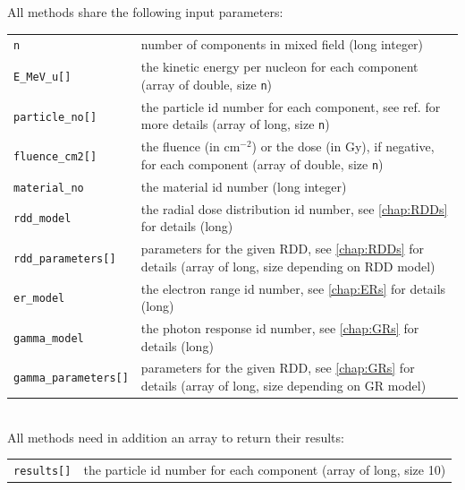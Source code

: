 All methods share the following input parameters:\\
\begin{tabular}{p{} p{}}
\texttt{n} & number of components in mixed field (long integer) \\
\texttt{E\_MeV\_u[]} & the kinetic energy per nucleon for each component (array of double, size \texttt{n}) \\
\texttt{particle\_no[]} & the particle id number for each component, see ref. for more details (array of long, size \texttt{n}) \\
\texttt{fluence\_cm2[]} & the fluence (in cm$^{-2}$) or the dose (in Gy), if negative, for each component (array of double, size \texttt{n}) \\
\texttt{material\_no} & the material id number (long integer) \\
\texttt{rdd\_model} & the radial dose distribution id number, see \ref{chap:RDDs} for details (long) \\
\texttt{rdd\_parameters[]} & parameters for the given RDD, see \ref{chap:RDDs} for details (array of long, size depending on RDD model) \\
\texttt{er\_model} & the electron range id number, see \ref{chap:ERs} for details (long) \\
\texttt{gamma\_model} & the photon response id number, see \ref{chap:GRs} for details (long) \\
\texttt{gamma\_parameters[]} & parameters for the given RDD, see \ref{chap:GRs} for details (array of long, size depending on GR model) \\
\end{tabular}\\

All methods need in addition an array to return their results:\\
\begin{tabular}{p{} p{}}
\texttt{results[]} & the particle id number for each component (array of long, size 10) \\
\end{tabular}

